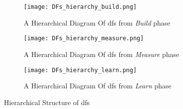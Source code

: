 \begin{figure}[htbp!]
    \centering
    \begin{subfigure}[b]{1.0\textwidth}
    \centering
    \texttt{[image: DFs\_hierarchy\_build.png]}
    \caption{A Hierarchical Diagram Of \ac{df}s from \textit{Build} phase}
    \label{fig:implementation:hierarchy:build}
    \end{subfigure}
    \begin{subfigure}[b]{1.0\textwidth}
    \centering
    \texttt{[image: DFs\_hierarchy\_measure.png]}
    \caption{A Hierarchical Diagram Of \ac{df}s from \textit{Measure} phase}
    \label{fig:implementation:hierarchy:measure} 
    \end{subfigure}             
    \begin{subfigure}[b]{0.8\textwidth}
    \centering
    \texttt{[image: DFs\_hierarchy\_learn.png]}
    \caption{A Hierarchical Diagram Of \ac{df}s from \textit{Learn} phase}
    \label{fig:implementation:hierarchy:learn}
    \end{subfigure}
    \caption[A Map Between DPs and DFs]{Hierarchical Structure of \ac{df}s}
    \label{fig:implementation:hierarchy}
\end{figure}

